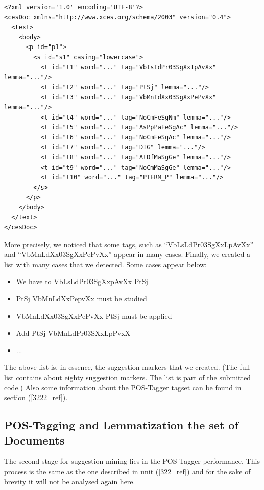{}
\begin{lstlisting}[frame=single, basicstyle=\small]
<?xml version='1.0' encoding='UTF-8'?>
<cesDoc xmlns="http://www.xces.org/schema/2003" version="0.4">
  <text>
    <body>
      <p id="p1">
        <s id="s1" casing="lowercase">
          <t id="t1" word="..." tag="VbIsIdPr03SgXxIpAvXx" lemma="..."/>
          <t id="t2" word="..." tag="PtSj" lemma="..."/>
          <t id="t3" word="..." tag="VbMnIdXx03SgXxPePvXx" lemma="..."/>
          <t id="t4" word="..." tag="NoCmFeSgNm" lemma="..."/>
          <t id="t5" word="..." tag="AsPpPaFeSgAc" lemma="..."/>
          <t id="t6" word="..." tag="NoCmFeSgAc" lemma="..."/>
          <t id="t7" word="..." tag="DIG" lemma="..."/>
          <t id="t8" word="..." tag="AtDfMaSgGe" lemma="..."/>
          <t id="t9" word="..." tag="NoCmMaSgGe" lemma="..."/>
          <t id="t10" word="..." tag="PTERM_P" lemma="..."/>
        </s>
      </p>
    </body>
  </text>
</cesDoc>
\end{lstlisting}

More precisely, we noticed that some tags, such as ``VbLsLdPr03SgXxLpAvXx'' and ``VbMnLdXx03SgXxPePvXx'' appear in many cases. Finally, we created a list with many cases that we detected. Some cases appear below:\\

\begin{itemize}

	\item We have to VbLsLdPr03SgXxpAvXx PtSj
	\item PtSj VbMnLdXxPepvXx must be studied
	\item VbMnLdXx03SgXxPePvXx PtSj must be applied
	\item Add PtSj VbMnLdPr03SXxLpPvxX
	\item ...\\

\end{itemize}
The above list is, in essence, the suggestion markers that we created. (The full list contains about eighty suggestion markers. The list is part of the submitted code.) Also some information about the POS-Tagger tagset can be found in section (\ref{3222_ref}).

\subsection{POS-Tagging and Lemmatization the set of Documents}\label{332_ref}
The second stage for suggestion mining lies in the POS-Tagger performance. This process is the same as the one described in unit (\ref{322_ref}) and for the sake of brevity it will not be analysed again here.

